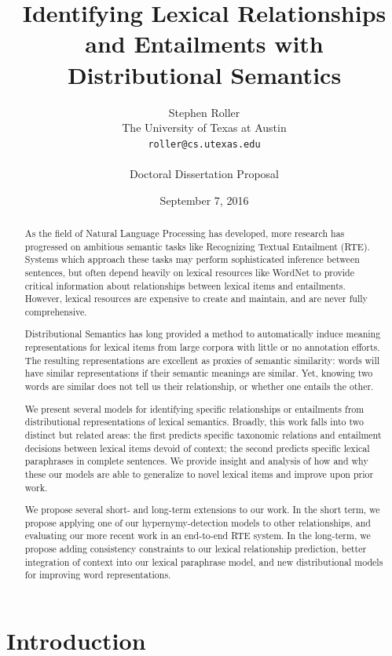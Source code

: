 \documentclass[12pt]{article}
\title{Identifying Lexical Relationships and Entailments with Distributional Semantics}
\author{Stephen Roller\\
The University of Texas at Austin\\
{\tt roller@cs.utexas.edu}\\
\\
Doctoral Dissertation Proposal}
\date{September 7, 2016}
\begin{document}
\maketitle

\begin{abstract}
  As the field of Natural Language Processing has developed, more research has
  progressed on ambitious semantic tasks like Recognizing Textual Entailment
  (RTE). Systems which approach these tasks may perform sophisticated
  inference between sentences, but often depend heavily on lexical resources
  like WordNet to provide critical information about relationships between
  lexical items and entailments. However, lexical resources are expensive to
  create and maintain, and are never fully comprehensive.

  Distributional Semantics has long provided a method to automatically induce
  meaning representations for lexical items from large corpora with little or
  no annotation efforts. The resulting representations are excellent
  as proxies of semantic similarity: words will have similar representations if
  their semantic meanings are similar. Yet, knowing two words are similar does
  not tell us their relationship, or whether one entails the other.

  We present several models for identifying specific relationships or
  entailments from distributional representations of lexical semantics.
  Broadly, this work falls into two distinct but related areas: the first
  predicts specific taxonomic relations and entailment decisions between
  lexical items devoid of context; the second predicts specific lexical
  paraphrases in complete sentences. We provide insight and analysis of how and
  why these our models are able to generalize to novel lexical items and
  improve upon prior work.

  We propose several short- and long-term extensions to our work. In the
  short term, we propose applying one of our hypernymy-detection models to
  other relationships, and evaluating our more recent work in an end-to-end
  RTE system. In the long-term, we propose adding consistency constraints to
  our lexical relationship prediction, better integration of context into
  our lexical paraphrase model, and new distributional models for improving
  word representations.
\end{abstract}

\pagebreak
\tableofcontents
\pagebreak

\section{Introduction}
\label{sec:intro}
\end{document}
